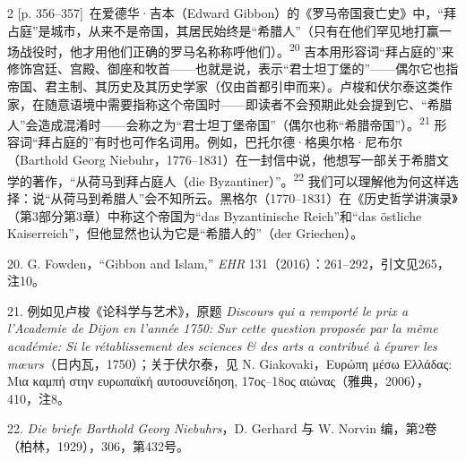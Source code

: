 \documentclass[10pt,a4paper]{article}
\begin{document}
\begin{paracol}{2}
{\scriptsize\color{gray}[p. 356–357]}\ 在爱德华·吉本（Edward Gibbon）的《罗马帝国衰亡史》中，“拜占庭”是城市，从来不是帝国，其居民始终是“希腊人”（只有在他们罕见地打赢一场战役时，他才用他们正确的罗马名称称呼他们）。\nobreak\textsuperscript{20} 吉本用形容词“拜占庭的”来修饰宫廷、宫殿、御座和牧首——也就是说，表示“君士坦丁堡的”——偶尔它也指帝国、君主制、其历史及其历史学家（仅由首都引申而来）。卢梭和伏尔泰这类作家，在随意语境中需要指称这个帝国时——即读者不会预期此处会提到它、“希腊人”会造成混淆时——会称之为“君士坦丁堡帝国”（偶尔也称“希腊帝国”）。\nobreak\textsuperscript{21} 形容词“拜占庭的”有时也可作名词用。例如，巴托尔德·格奥尔格·尼布尔（Barthold Georg Niebuhr，1776–1831）在一封信中说，他想写一部关于希腊文学的著作，“从荷马到拜占庭人（die Byzantiner）”。\nobreak\textsuperscript{22} 我们可以理解他为何这样选择：说“从荷马到希腊人”会不知所云。黑格尔（1770–1831）在《历史哲学讲演录》（第3部分第3章）中称这个帝国为“das Byzantinische Reich”和“das östliche Kaiserreich”，但他显然也认为它是“希腊人的”（der Griechen）。\par{\small 20. G. Fowden，“Gibbon and Islam,” \textit{EHR} 131（2016）：261–292，引文见265，注10。\par}{\small 21. 例如见卢梭《论科学与艺术》，原题 \textit{Discours qui a remporté le prix a l’Academie de Dijon en l’année 1750: Sur cette question proposée par la même académie: Si le rétablissement des sciences \& des arts a contribué à épurer les mœurs}（日内瓦，1750）；关于伏尔泰，见 N. Giakovaki，Ευρώπη μέσω Ελλάδας: Μια καμπή στην ευρωπαϊκή αυτοσυνείδηση, 17ος–18ος αιώνας（雅典，2006），410，注8。\par}{\small 22. \textit{Die briefe Barthold Georg Niebuhrs}，D. Gerhard 与 W. Norvin 编，第2卷（柏林，1929），306，第432号。\par}
\switchcolumn

\end{paracol}
\end{document}
